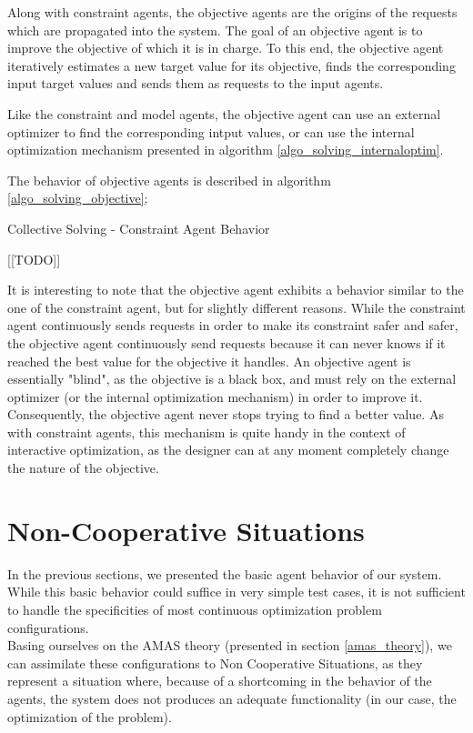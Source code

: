 Along with constraint agents, the objective agents are the origins of the requests which are propagated into the system. The goal of an objective agent is to improve the objective of which it is in charge. To this end, the objective agent iteratively estimates a new target value for its objective, finds the corresponding input target values and sends them as requests to the input agents.

Like the constraint and model agents, the objective agent can use an external optimizer to find the corresponding intput values, or can use the internal optimization mechanism presented in algorithm \ref{algo_solving_internaloptim}.

The behavior of objective agents is described in algorithm \ref{algo_solving_objective};

\begin{algorithm}
\caption{Collective Solving - Constraint Agent Behavior}
\label{algo_solving_objective}

	[[TODO]]\;
	
\end{algorithm}

It is interesting to note that the objective agent exhibits a behavior similar to the one of the constraint agent, but for slightly different reasons. While the constraint agent continuously sends requests in order to make its constraint safer and safer, the objective agent continuously send requests because it can never knows if it reached the best value for the objective it handles. An objective agent is essentially "blind", as the objective is a black box, and must rely on the external optimizer (or the internal optimization mechanism) in order to improve it. Consequently, the objective agent never stops trying to find a better value. As with constraint agents, this mechanism is quite handy in the context of interactive optimization, as the designer can at any moment completely change the nature of the objective.

\section{Non-Cooperative Situations}

In the previous sections, we presented the basic agent behavior of our system. While this basic behavior could suffice in very simple test cases, it is not sufficient to handle the specificities of most continuous optimization problem configurations.\\
Basing ourselves on the AMAS theory (presented in section \ref{amas_theory}), we can assimilate these configurations to Non Cooperative Situations, as they represent a situation where, because of a shortcoming in the behavior of the agents, the system does not produces an adequate functionality (in our case, the optimization of the problem).

